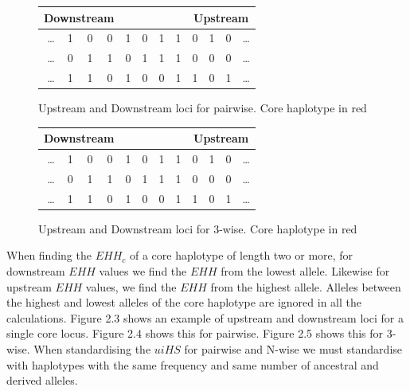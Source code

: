 \documentclass[a4paper,12pt]{report}
\begin{document}
\begin{figure}[h!]
\begin{center}
  \begin{tabular}{ | r c c c | c c c c | c c c l |}
    \multicolumn{4}{c}{Downstream} & \multicolumn{4}{c}{} & \multicolumn{4}{c}{Upstream} \\
    \hline
    \ldots & 1 & 0 & 0 & \color{red} 1 & 0 & 1 & \color{red} 1 & 0 & 1 & 0 & \ldots \\
    \ldots & 0 & 1 & 1 & \color{red} 0 & 1 & 1 & \color{red} 1 & 0 & 0 & 0 & \ldots \\
    \ldots & 1 & 1 & 0 & \color{red} 1 & 0 & 0 & \color{red} 1 & 1 & 0 & 1 & \ldots \\
    \hline
  \end{tabular}
      \caption{Upstream and Downstream loci for pairwise. Core haplotype in red}
\end{center}
\end{figure}

\begin{figure}[h!]
\begin{center}
  \begin{tabular}{ | r c c c | c c c c | c c c l |}
    \multicolumn{4}{c}{Downstream} & \multicolumn{4}{c}{} & \multicolumn{4}{c}{Upstream} \\
    \hline
    \ldots & 1 & 0 & 0 & \color{red} 1 & \color{red} 0 & 1 & \color{red} 1 & 0 & 1 & 0 & \ldots \\
    \ldots & 0 & 1 & 1 & \color{red} 0 & \color{red} 1 & 1 & \color{red} 1 & 0 & 0 & 0 & \ldots \\
    \ldots & 1 & 1 & 0 & \color{red} 1 & \color{red} 0 & 0 & \color{red} 1 & 1 & 0 & 1 & \ldots \\
    \hline
  \end{tabular}
        \caption{Upstream and Downstream loci for 3-wise. Core haplotype in red}
\end{center}
\end{figure}

When finding the $EHH_c$ of a core haplotype of length two or more, for downstream $EHH$ values we find the $EHH$ from the lowest allele. Likewise for upstream $EHH$ values, we find the $EHH$ from the highest allele. Alleles between the highest and lowest alleles of the core haplotype are ignored in all the calculations. Figure 2.3 shows an example of upstream and downstream loci for a single core locus. Figure 2.4 shows this for pairwise. Figure 2.5 shows this for 3-wise. When standardising the $uiHS$ for pairwise and N-wise we must standardise with haplotypes with the same frequency and same number of ancestral and derived alleles.
\end{document}

